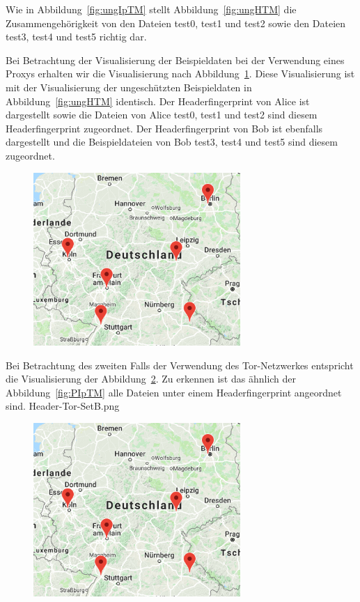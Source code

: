 \documentclass[
    fontsize=12pt,
    headings=small,
    parskip=half,           %
    bibliography=totoc,
    numbers=noenddot,       %
    open=any,               %
    ]{scrreprt}
\begin{document}
Wie in Abbildung~\ref{fig:ungIpTM} stellt Abbildung~\ref{fig:ungHTM} die Zusammengehörigkeit von den Dateien test0, test1 und test2 sowie den Dateien test3, test4 und test5 richtig dar.

Bei Betrachtung der Visualisierung der Beispieldaten bei der Verwendung eines Proxys erhalten wir die Visualisierung nach Abbildung~\ref{fig:PHTM}.
Diese Visualisierung ist mit der Visualisierung der ungeschützten Beispieldaten in Abbildung~\ref{fig:ungHTM} identisch. 
Der Headerfingerprint von Alice ist dargestellt sowie die Dateien von Alice test0, test1 und test2 sind diesem Headerfingerprint zugeordnet.
Der Headerfingerprint von Bob ist ebenfalls dargestellt und die Beispieldateien von Bob test3, test4 und test5 sind diesem zugeordnet.

\begin{figure}[H]
\includegraphics[width=0.7\textwidth]{../pic/IP-Tor-SetB.png}
\label{fig:PHTM}
\end{figure}

Bei Betrachtung des zweiten Falls der Verwendung des Tor-Netzwerkes entspricht die Visualisierung der Abbildung~\ref{fig:THTM}.
Zu erkennen ist das ähnlich der Abbildung~\ref{fig:PIpTM} alle Dateien unter einem Headerfingerprint angeordnet sind.
Header-Tor-SetB.png
\begin{figure}[H]
\includegraphics[width=0.7\textwidth]{../pic/IP-Tor-SetB.png}
\label{fig:THTM}
\end{figure}
\end{document}
